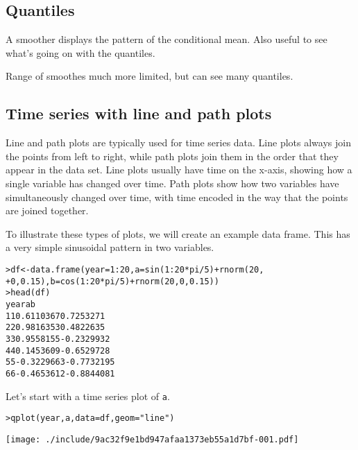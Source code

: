 \subsection{Quantiles}\label{sub:quantiles}

A smoother displays the pattern of the conditional mean.  Also useful to see what's going on with the quantiles.

Range of smoothes much more limited, but can see many quantiles.  

\subsection{Time series with line and path plots}\label{sub:line_plot}

Line and path plots are typically used for time series data.  Line plots always join the points from left to right, while path plots join them in the order that they appear in the data set.  Line plots usually have time on the x-axis, showing how a single variable has changed over time.  Path plots show how two variables have simultaneously changed over time, with time encoded in the way that the points are joined together.

To illustrate these types of plots, we will create an example data frame.  This has a very simple sinusoidal pattern in two variables.

\begin{alltt}
> df <- data.frame(year = 1:20, a = sin(1:20 * pi/5) + rnorm(20, 
+     0, 0.15), b = cos(1:20 * pi/5) + rnorm(20, 0, 0.15))
> head(df)
  year          a          b
1    1  0.6110367  0.7253271
2    2  0.9816353  0.4822635
3    3  0.9558155 -0.2329932
4    4  0.1453609 -0.6529728
5    5 -0.3229663 -0.7732195
6    6 -0.4653612 -0.8844081

\end{alltt}

Let's start with a time series plot of {\tt a}.

\begin{alltt}
> qplot(year, a, data = df, geom = "line")
\end{alltt}
\texttt{[image: ./include/9ac32f9e1bd947afaa1373eb55a1d7bf-001.pdf]}
\begin{alltt}

\end{alltt}

